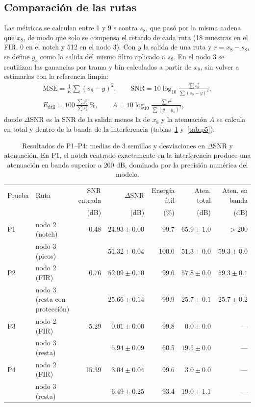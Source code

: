 \documentclass[10pt,a4paper,twocolumn]{article}
\begin{document}
\subsection{Comparación de las rutas}
Las métricas se calculan entre 1 y 9 s contra $s_8$, que pasó por la misma cadena que $x_8$, de modo que solo se compensa el retardo de cada ruta (18 muestras en el FIR, 0 en el notch y 512 en el nodo 3). Con $y$ la salida de una ruta y $r = x_8 - s_8$, se define $y_s$ como la salida del mismo filtro aplicado a $s_8$. En el nodo 3 se reutilizan las ganancias por trama y bin calculadas a partir de $x_8$, sin volver a estimarlas con la referencia limpia:
\begin{gather}
\text{MSE}=\tfrac{1}{K}\textstyle\sum(s_8-y)^2,\qquad \text{SNR}=10\log_{10}\frac{\sum s_8^2}{\sum(s_8-y)^2},\\
E_{\text{útil}}=100\,\frac{\sum y_s^2}{\sum s_8^2}\ \%,\qquad A=10\log_{10}\frac{\sum r^2}{\sum (y-y_s)^2},
\end{gather}
donde $\Delta$SNR es la SNR de la salida menos la de $x_8$ y la atenuación $A$ se calcula en total y dentro de la banda de la interferencia (tablas~\ref{tab:metricas} y~\ref{tab:p5}).
\begin{table}[!t]\centering\caption{Resultados de P1--P4: medias de 3 semillas y desviaciones en $\Delta$SNR y atenuación. En P1, el notch centrado exactamente en la interferencia produce una atenuación en banda superior a 200 dB, dominada por la precisión numérica del modelo.}\label{tab:metricas}\footnotesize
\begin{tabular}{llrrrrr}\toprule
Prueba & Ruta & SNR entrada & $\Delta$SNR & Energía útil & Aten. total & Aten. en banda\\
 & & (dB) & (dB) & (\%) & (dB) & (dB)\\\midrule
P1 & nodo 2 (notch) & 0.48 & $24.93\pm0.00$ & 99.7 & $65.9\pm1.0$ & $>200$\\
   & nodo 3 (picos) &      & $51.32\pm0.04$ & 100.0 & $51.3\pm0.0$ & $59.3\pm0.0$\\
P2 & nodo 2 (FIR) & 0.76 & $52.09\pm0.10$ & 99.6 & $57.8\pm0.0$ & $59.3\pm0.1$\\
   & nodo 3 (resta con protección) & & $25.66\pm0.14$ & 99.9 & $25.7\pm0.1$ & $25.7\pm0.2$\\
P3 & nodo 2 (FIR) & 5.29 & $0.01\pm0.00$ & 99.8 & $0.0\pm0.0$ & ---\\
   & nodo 3 (resta) & & $5.94\pm0.09$ & 60.5 & $19.5\pm0.0$ & ---\\
P4 & nodo 2 (FIR) & 15.39 & $3.04\pm0.04$ & 99.6 & $3.0\pm0.0$ & ---\\
   & nodo 3 (resta) & & $6.49\pm0.25$ & 93.4 & $19.0\pm1.1$ & ---\\\bottomrule
\end{tabular}\end{table}
\end{document}
